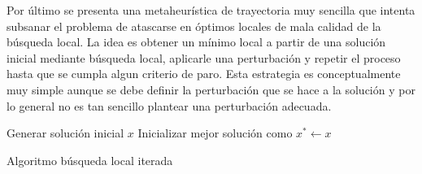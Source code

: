 \smallskip
Por último se presenta una metaheurística de trayectoria muy sencilla que intenta subsanar el problema de atascarse en óptimos locales de mala calidad de la búsqueda local. La idea es obtener un mínimo local a partir de una solución inicial mediante búsqueda local, aplicarle una perturbación y repetir el proceso hasta que se cumpla algun criterio de paro. Esta estrategia es conceptualmente muy simple aunque se debe definir la perturbación que se hace a la solución y por lo general no es tan sencillo plantear una perturbación adecuada.\\

\begin{algorithm}[H]
 Generar solución inicial $x$\;
 Inicializar mejor solución como $x^*\leftarrow x$
    \label{alg:ILS}
    \caption{Algoritmo búsqueda local iterada}
\end{algorithm}

